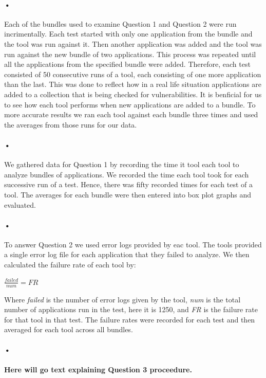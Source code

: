 \documentclass[twocolumn]{article}
\begin{document}
\paragraph{•}
	Each of the bundles used to examine Question 1 and Question 2 were run incrimentally. Each test started with only one application from the bundle and the tool was run against it. Then another application was added and the tool was run against the new bundle of two applications. This process was repeated until all the applications from the specified bundle were added. Therefore, each test consisted of 50 consecutive runs of a tool, each consisting of one more application than the last. This was done to reflect how in a real life situation applications are added to a collection that is being checked for vulnerabilities. It is benficial for us to see how each tool performs when new applications are added to a bundle. To more accurate results we ran each tool against each bundle three times and used the averages from those runs for our data.
\paragraph{•}
	We gathered data for Question 1 by recording the time it tool each tool to analyze bundles of applications. We recorded the time each tool took for each successive run of a test. Hence, there was fifty recorded times for each test of a tool. The averages for each bundle were then entered into box plot graphs and evaluated.
\paragraph{•}
	To answer Question 2 we used error logs provided by eac tool. The tools provided a single error log file for each application that they failed to analyze. We then calculated the failure rate of each tool by:\\
	\begin{center}
		\(\frac{failed}{num}=FR\)
	\end{center}
	Where \textit{failed} is the number of error logs given by the tool, \textit{num} is the total number of applications run in the test, here it is 1250, and \textit{FR} is the failure rate for that tool in that test. The failure rates were recorded for each test and then averaged for each tool across all bundles.
\paragraph{•}
	\textbf{Here will go text explaining Question 3 proceedure.}
\end{document}
